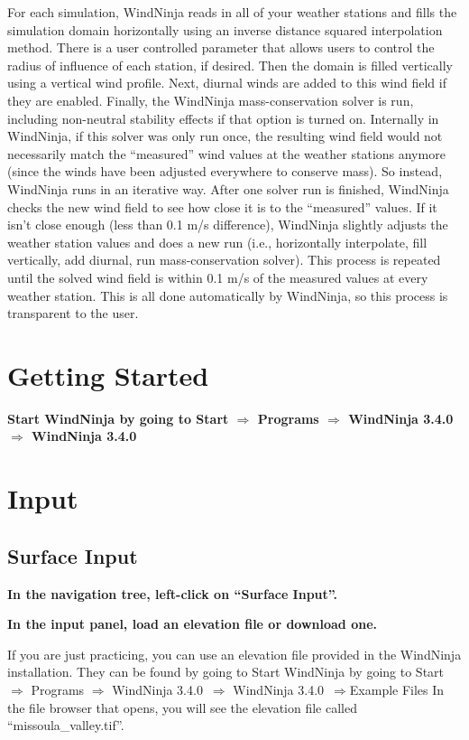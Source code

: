 \documentclass[12pt]{article}
\newcommand\vn{3.4.0}
\begin{document}
For each simulation, WindNinja reads in all of your weather stations and fills the simulation domain horizontally using an inverse distance squared interpolation method.  There is a user controlled parameter that allows users to control the radius of influence of each station, if desired.  Then the domain is filled vertically using a vertical wind profile.  Next, diurnal winds are added to this wind field if they are enabled.  Finally, the WindNinja mass-conservation solver is run, including non-neutral stability effects if that option is turned on.  Internally in WindNinja, if this solver was only run once, the resulting wind field would not necessarily match the “measured” wind values at the weather stations anymore (since the winds have been adjusted everywhere to conserve mass).  So instead, WindNinja runs in an iterative way.  After one solver run is finished, WindNinja checks the new wind field to see how close it is to the “measured” values.  If it isn't close enough (less than 0.1 m/s difference), WindNinja slightly adjusts the weather station values and does a new run (i.e., horizontally interpolate, fill vertically, add diurnal, run mass-conservation solver).  This process is repeated until the solved wind field is within 0.1 m/s of the measured values at every weather station.  This is all done automatically by WindNinja, so this process is transparent to the user.  

\section{Getting Started}

\textbf{\color{red}Start WindNinja by going to Start $\Rightarrow$ Programs $\Rightarrow$ WindNinja \vn\ $\Rightarrow$ WindNinja \vn\ }

\section{Input}
\subsection{Surface Input}

\textbf{\color{red}In the navigation tree, left-click on “Surface Input”.}

\textbf{\color{red}
In the input panel, load an elevation file or download one.}

If you are just practicing, you can use an elevation file provided in the WindNinja installation.  They can be found by going to Start WindNinja by going to Start $\Rightarrow$ Programs $\Rightarrow$ WindNinja \vn\ $\Rightarrow$ WindNinja \vn\ $\Rightarrow$Example Files  In the file browser that opens, you will see the elevation file called “missoula\_valley.tif”.
\end{document}
